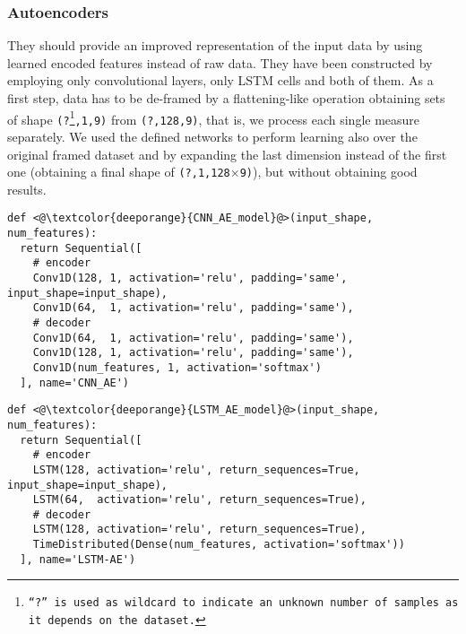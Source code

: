 \subsubsection{Autoencoders}\label{sssec:ae}
They should provide an improved representation of the input data by using learned encoded features instead of raw data. %
They have been constructed by employing only convolutional layers, only LSTM cells and both of them.
As a first step, data has to be de-framed by a flattening-like operation obtaining sets of shape \texttt{(?\footnote{``?'' is used as wildcard to indicate an unknown number of samples as it depends on the dataset.},1,9)} from \texttt{(?,128,9)}, that is, we process each single measure separately.
We used the defined networks to perform learning also over the original framed dataset and by expanding the last dimension instead of the first one (obtaining a final shape of \texttt{(?,1,128$\times$9)}), but without obtaining good results.

\begin{minipage}[c]{.9\columnwidth}
\vspace*{.2em}
\begin{lstlisting}
def <@\textcolor{deeporange}{CNN_AE_model}@>(input_shape, num_features):
  return Sequential([
    # encoder
    Conv1D(128, 1, activation='relu', padding='same', input_shape=input_shape),
    Conv1D(64,  1, activation='relu', padding='same'),
    # decoder
    Conv1D(64,  1, activation='relu', padding='same'),
    Conv1D(128, 1, activation='relu', padding='same'),
    Conv1D(num_features, 1, activation='softmax')
  ], name='CNN_AE')
\end{lstlisting}
\end{minipage}

\begin{minipage}[c]{.9\columnwidth}
\vspace*{.2em}
\begin{lstlisting}
def <@\textcolor{deeporange}{LSTM_AE_model}@>(input_shape, num_features):
  return Sequential([
    # encoder
    LSTM(128, activation='relu', return_sequences=True, input_shape=input_shape),
    LSTM(64,  activation='relu', return_sequences=True),
    # decoder
    LSTM(128, activation='relu', return_sequences=True),
    TimeDistributed(Dense(num_features, activation='softmax'))
  ], name='LSTM-AE')
\end{lstlisting}
\end{minipage}

